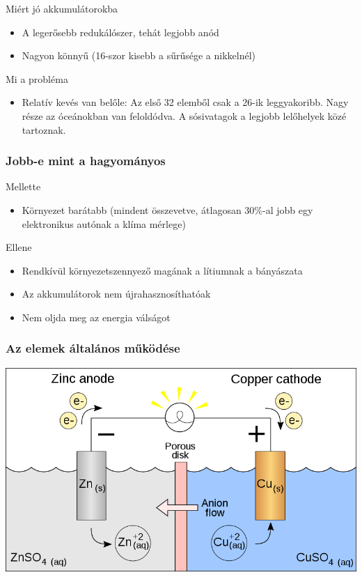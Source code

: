 \documentclass{beamer}
\begin{document}
\begin{frame}
\begin{block}{Miért jó akkumulátorokba}
\begin{itemize}
\item A legerősebb redukálószer, tehát legjobb anód
\item Nagyon könnyű (16-szor kisebb a sűrűsége a nikkelnél)
\end{itemize}
\end{block}

\begin{block}{Mi a probléma}
\begin{itemize}
\item Relatív kevés van belőle: Az első 32 elemből csak a 26-ik leggyakoribb. Nagy része az óceánokban van feloldódva. A sósivatagok a legjobb lelőhelyek közé tartoznak.
\end{itemize}
\end{block}
\end{frame}

\begin{frame}
\frametitle{
Jobb-e mint a hagyományos}
\begin{block}{Mellette}
\begin{itemize}
\item Környezet barátabb (mindent összevetve, átlagosan 30\%-al jobb egy elektronikus autónak a klíma mérlege)
\end{itemize}
\end{block}

\begin{block}{Ellene}
\begin{itemize}
\item Rendkívül környezetszennyező magának a lítiumnak a bányászata
\item Az akkumulátorok nem újrahasznosíthatóak
\item Nem oljda meg az energia válságot
\end{itemize}
\end{block}
\end{frame}

\begin{frame}
\frametitle{Az elemek általános működése}
\begin{center}
\includegraphics[scale=0.3]{galvanicbattery}
\end{center}
\end{frame}
\end{document}
